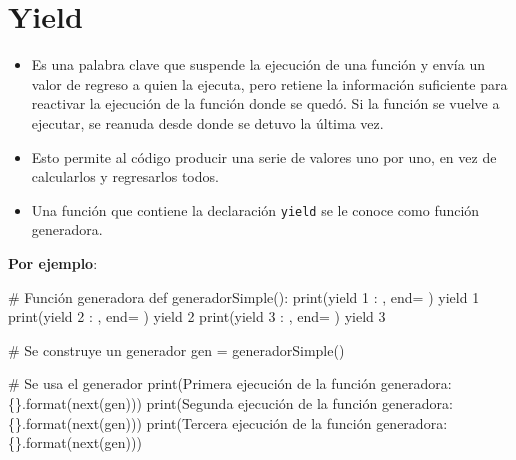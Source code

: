 \documentclass[
  letterpaper,
  DIV=11,
  numbers=noendperiod]{scrreprt}
\newenvironment{Shaded}{\begin{snugshade}}{\end{snugshade}}
\newcommand{\BuiltInTok}[1]{\textcolor[rgb]{0.00,0.23,0.31}{#1}}
\newcommand{\CommentTok}[1]{\textcolor[rgb]{0.37,0.37,0.37}{#1}}
\newcommand{\ControlFlowTok}[1]{\textcolor[rgb]{0.00,0.23,0.31}{#1}}
\newcommand{\DecValTok}[1]{\textcolor[rgb]{0.68,0.00,0.00}{#1}}
\newcommand{\KeywordTok}[1]{\textcolor[rgb]{0.00,0.23,0.31}{#1}}
\newcommand{\NormalTok}[1]{\textcolor[rgb]{0.00,0.23,0.31}{#1}}
\newcommand{\OperatorTok}[1]{\textcolor[rgb]{0.37,0.37,0.37}{#1}}
\newcommand{\SpecialCharTok}[1]{\textcolor[rgb]{0.37,0.37,0.37}{#1}}
\newcommand{\StringTok}[1]{\textcolor[rgb]{0.13,0.47,0.30}{#1}}
\begin{document}
\chapter{Yield}\label{yield}

\begin{itemize}
\item
  Es una palabra clave que suspende la ejecución de una función y envía
  un valor de regreso a quien la ejecuta, pero retiene la información
  suficiente para reactivar la ejecución de la función donde se quedó.
  Si la función se vuelve a ejecutar, se reanuda desde donde se detuvo
  la última vez.
\item
  Esto permite al código producir una serie de valores uno por uno, en
  vez de calcularlos y regresarlos todos.
\item
  Una función que contiene la declaración \texttt{yield} se le conoce
  como función generadora.
\end{itemize}

\textbf{Por ejemplo}:

\begin{Shaded}
\begin{Highlighting}[]
\CommentTok{\# Función generadora}
\KeywordTok{def}\NormalTok{ generadorSimple():}
    \BuiltInTok{print}\NormalTok{(}\StringTok{\textquotesingle{}yield 1 : \textquotesingle{}}\NormalTok{, end}\OperatorTok{=}\StringTok{\textquotesingle{} \textquotesingle{}}\NormalTok{)}
    \ControlFlowTok{yield} \DecValTok{1}
    \BuiltInTok{print}\NormalTok{(}\StringTok{\textquotesingle{}yield 2 : \textquotesingle{}}\NormalTok{, end}\OperatorTok{=}\StringTok{\textquotesingle{} \textquotesingle{}}\NormalTok{)}
    \ControlFlowTok{yield} \DecValTok{2}
    \BuiltInTok{print}\NormalTok{(}\StringTok{\textquotesingle{}yield 3 : \textquotesingle{}}\NormalTok{, end}\OperatorTok{=}\StringTok{\textquotesingle{} \textquotesingle{}}\NormalTok{)}
    \ControlFlowTok{yield} \DecValTok{3}

\CommentTok{\# Se construye un generador}
\NormalTok{gen }\OperatorTok{=}\NormalTok{ generadorSimple()}

\CommentTok{\# Se usa el generador}
\BuiltInTok{print}\NormalTok{(}\StringTok{\textquotesingle{}Primera ejecución de la función generadora: }\SpecialCharTok{\{\}}\StringTok{\textquotesingle{}}\NormalTok{.}\BuiltInTok{format}\NormalTok{(}\BuiltInTok{next}\NormalTok{(gen)))}
\BuiltInTok{print}\NormalTok{(}\StringTok{\textquotesingle{}Segunda ejecución de la función generadora: }\SpecialCharTok{\{\}}\StringTok{\textquotesingle{}}\NormalTok{.}\BuiltInTok{format}\NormalTok{(}\BuiltInTok{next}\NormalTok{(gen)))}
\BuiltInTok{print}\NormalTok{(}\StringTok{\textquotesingle{}Tercera ejecución de la función generadora: }\SpecialCharTok{\{\}}\StringTok{\textquotesingle{}}\NormalTok{.}\BuiltInTok{format}\NormalTok{(}\BuiltInTok{next}\NormalTok{(gen)))}
\end{Highlighting}
\end{Shaded}
\end{document}
